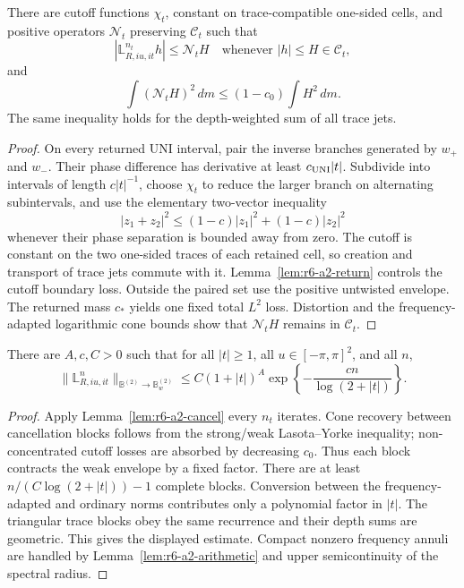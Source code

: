 \begin{lemma}
\label{lem:r6-a2-cancel}
There are cutoff functions \(\chi_t\), constant on trace-compatible one-sided
cells, and positive operators \(\mathcal N_t\) preserving \(\mathscr C_t\)
such that
\[
|\mathbb L_{R,iu,it}^{n_t}h|\le\mathcal N_tH
\quad\text{whenever }|h|\le H\in\mathscr C_t,
\]
and
\[
\int(\mathcal N_tH)^2\,dm
\le(1-c_0)\int H^2\,dm.
\]
The same inequality holds for the depth-weighted sum of all trace jets.
\end{lemma}

\begin{proof}
On every returned UNI interval, pair the inverse branches generated by
\(w_+\) and \(w_-\).  Their phase difference has derivative at least
\(c_{\rm UNI}|t|\).  Subdivide into intervals of length \(c|t|^{-1}\), choose
\(\chi_t\) to reduce the larger branch on alternating subintervals, and use
the elementary two-vector inequality
\[
|z_1+z_2|^2\le(1-c)|z_1|^2+(1-c)|z_2|^2
\]
whenever their phase separation is bounded away from zero.  The cutoff is
constant on the two one-sided traces of each retained cell, so creation and
transport of trace jets commute with it.  Lemma~\ref{lem:r6-a2-return}
controls the cutoff boundary loss.  Outside the paired set use the positive
untwisted envelope.  The returned mass \(c_*\) yields one fixed total
\(L^2\) loss.  Distortion and the frequency-adapted logarithmic cone bounds
show that \(\mathcal N_tH\) remains in \(\mathscr C_t\).
\end{proof}

\begin{theorem}
\label{thm:r6-a2-dolgopyat}
There are \(A,c,C>0\) such that for all \(|t|\ge1\), all
\(u\in[-\pi,\pi]^2\), and all \(n\),
\[
\|\mathbb L_{R,iu,it}^n\|_{\mathbb B^{(2)}\to\mathbb B_w^{(2)}}
\le C(1+|t|)^A
\exp\left\{-\frac{cn}{\log(2+|t|)}\right\}.
\]
\end{theorem}

\begin{proof}
Apply Lemma~\ref{lem:r6-a2-cancel} every \(n_t\) iterates.  Cone recovery
between cancellation blocks follows from the strong/weak Lasota--Yorke
inequality; non-concentrated cutoff losses are absorbed by decreasing
\(c_0\).  Thus each block contracts the weak envelope by a fixed factor.
There are at least \(n/(C\log(2+|t|))-1\) complete blocks.  Conversion between
the frequency-adapted and ordinary norms contributes only a polynomial factor
in \(|t|\).  The triangular trace blocks obey the same recurrence and their
depth sums are geometric.  This gives the displayed estimate.  Compact
nonzero frequency annuli are handled by Lemma~\ref{lem:r6-a2-arithmetic} and
upper semicontinuity of the spectral radius.
\end{proof}


